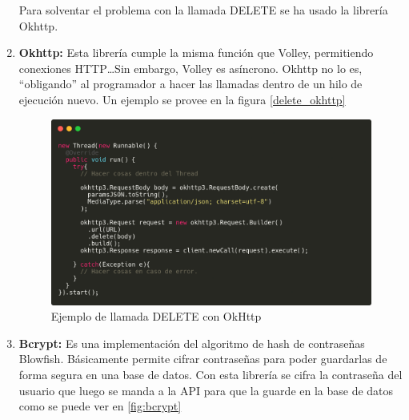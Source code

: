 \begin{enumerate}
Para solventar el problema con la llamada DELETE se ha usado la librería Okhttp.

\item \textbf{Okhttp: } Esta librería cumple la misma función que Volley, permitiendo conexiones HTTP\dots Sin embargo, Volley es asíncrono. Okhttp no lo es, ``obligando'' al programador a hacer las llamadas dentro de un hilo de ejecución nuevo. Un ejemplo se provee en la figura \ref{delete_okhttp}

% 
% 
% 

\begin{figure}[h!]
  \centering
  \includegraphics[width=0.8\linewidth]{figs/Desarrollo/Codigo/okhttp_ejemplo}
  \caption[Llamada DELETE con Okhttp]{Ejemplo de llamada DELETE con OkHttp}
  \label{fig:delete_okhttp}
\end{figure}

\item \textbf{Bcrypt: } Es una implementación del algoritmo de hash de contraseñas Blowfish. Básicamente permite cifrar contraseñas para poder guardarlas de forma segura en una base de datos. Con esta librería se cifra la contraseña del usuario que luego se manda a la API para que la guarde en la base de datos como se puede ver en \ref{fig:bcrypt}


\end{enumerate}

